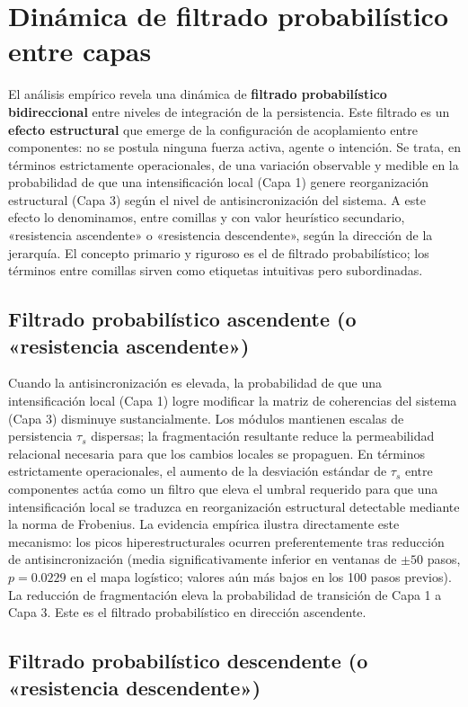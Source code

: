 \section{Dinámica de filtrado probabilístico entre capas}

El análisis empírico revela una dinámica de \textbf{filtrado probabilístico bidireccional} entre niveles de integración de la persistencia. Este filtrado es un \textbf{efecto estructural} que emerge de la configuración de acoplamiento entre componentes: no se postula ninguna fuerza activa, agente o intención. Se trata, en términos estrictamente operacionales, de una variación observable y medible en la probabilidad de que una intensificación local (Capa 1) genere reorganización estructural (Capa 3) según el nivel de antisincronización del sistema. A este efecto lo denominamos, entre comillas y con valor heurístico secundario, «resistencia ascendente» o «resistencia descendente», según la dirección de la jerarquía. El concepto primario y riguroso es el de filtrado probabilístico; los términos entre comillas sirven como etiquetas intuitivas pero subordinadas.

\subsection{Filtrado probabilístico ascendente (o «resistencia ascendente»)}

Cuando la antisincronización es elevada, la probabilidad de que una intensificación local (Capa 1) logre modificar la matriz de coherencias del sistema (Capa 3) disminuye sustancialmente. Los módulos mantienen escalas de persistencia $\tau_s$ dispersas; la fragmentación resultante reduce la permeabilidad relacional necesaria para que los cambios locales se propaguen. En términos estrictamente operacionales, el aumento de la desviación estándar de $\tau_s$ entre componentes actúa como un filtro que eleva el umbral requerido para que una intensificación local se traduzca en reorganización estructural detectable mediante la norma de Frobenius. La evidencia empírica ilustra directamente este mecanismo: los picos hiperestructurales ocurren preferentemente tras reducción de antisincronización (media significativamente inferior en ventanas de $\pm 50$ pasos, $p=0.0229$ en el mapa logístico; valores aún más bajos en los 100 pasos previos). La reducción de fragmentación eleva la probabilidad de transición de Capa 1 a Capa 3. Este es el filtrado probabilístico en dirección ascendente.

\subsection{Filtrado probabilístico descendente (o «resistencia descendente»)}

